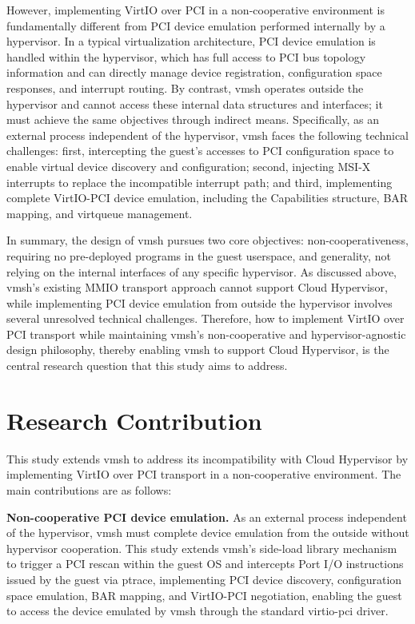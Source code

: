 \begin{ZhChapter}
However, implementing VirtIO over PCI in a non-cooperative environment is fundamentally different from PCI device emulation performed internally by a hypervisor. In a typical virtualization architecture, PCI device emulation is handled within the hypervisor, which has full access to PCI bus topology information and can directly manage device registration, configuration space responses, and interrupt routing. By contrast, vmsh operates outside the hypervisor and cannot access these internal data structures and interfaces; it must achieve the same objectives through indirect means. Specifically, as an external process independent of the hypervisor, vmsh faces the following technical challenges: first, intercepting the guest's accesses to PCI configuration space to enable virtual device discovery and configuration; second, injecting MSI-X interrupts to replace the incompatible interrupt path; and third, implementing complete VirtIO-PCI device emulation, including the Capabilities structure, BAR mapping, and virtqueue management.

In summary, the design of vmsh pursues two core objectives: non-cooperativeness, requiring no pre-deployed programs in the guest userspace, and generality, not relying on the internal interfaces of any specific hypervisor. As discussed above, vmsh's existing MMIO transport approach cannot support Cloud Hypervisor, while implementing PCI device emulation from outside the hypervisor involves several unresolved technical challenges. Therefore, how to implement VirtIO over PCI transport while maintaining vmsh's non-cooperative and hypervisor-agnostic design philosophy, thereby enabling vmsh to support Cloud Hypervisor, is the central research question that this study aims to address.

\section{Research Contribution}
\label{sec:contribution}

This study extends vmsh to address its incompatibility with Cloud Hypervisor by implementing VirtIO over PCI transport in a non-cooperative environment. The main contributions are as follows:

\begin{sloppypar}
\textbf{Non-cooperative PCI device emulation.} As an external process independent of the hypervisor, vmsh must complete device emulation from the outside without hypervisor cooperation. This study extends vmsh's side-load library mechanism to trigger a PCI rescan within the guest OS and intercepts Port I/O instructions issued by the guest via ptrace, implementing PCI device discovery, configuration space emulation, BAR mapping, and VirtIO-PCI negotiation, enabling the guest to access the device emulated by vmsh through the standard virtio-pci driver.
\end{sloppypar}


\end{ZhChapter}
